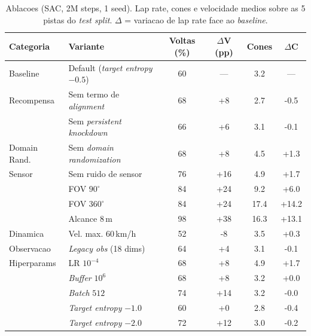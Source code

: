 \begin{table}[H]
\centering
\caption{Ablacoes (SAC, 2M steps, 1 seed). Lap rate, cones e velocidade medios sobre as 5 pistas do \textit{test split}. $\Delta$ = variacao de lap rate face ao \textit{baseline}.}
\label{tab:ablations}
\begin{tabular}{llcccc}
\toprule
\textbf{Categoria} & \textbf{Variante} & \textbf{Voltas (\%)} & \textbf{$\Delta$V (pp)} & \textbf{Cones} & \textbf{$\Delta$C} \\
\midrule
\addlinespace[2pt]
Baseline & Default (\textit{target entropy} $-0.5$) & 60 & --- & 3.2 & --- \\
\addlinespace[2pt]
Recompensa & Sem termo de \textit{alignment} & 68 & +8 & 2.7 & -0.5 \\
 & Sem \textit{persistent knockdown} & 66 & +6 & 3.1 & -0.1 \\
\addlinespace[2pt]
Domain Rand. & Sem \textit{domain randomization} & 68 & +8 & 4.5 & +1.3 \\
\addlinespace[2pt]
Sensor & Sem ruido de sensor & 76 & +16 & 4.9 & +1.7 \\
 & FOV $90^\circ$ & 84 & +24 & 9.2 & +6.0 \\
 & FOV $360^\circ$ & 84 & +24 & 17.4 & +14.2 \\
 & Alcance $8$\,m & 98 & +38 & 16.3 & +13.1 \\
\addlinespace[2pt]
Dinamica & Vel. max. $60$\,km/h & 52 & -8 & 3.5 & +0.3 \\
\addlinespace[2pt]
Observacao & \textit{Legacy obs} (18 dims) & 64 & +4 & 3.1 & -0.1 \\
\addlinespace[2pt]
Hiperparams & LR $10^{-4}$ & 68 & +8 & 4.9 & +1.7 \\
 & \textit{Buffer} $10^6$ & 68 & +8 & 3.2 & +0.0 \\
 & \textit{Batch} $512$ & 74 & +14 & 3.2 & -0.0 \\
 & \textit{Target entropy} $-1.0$ & 60 & +0 & 2.8 & -0.4 \\
 & \textit{Target entropy} $-2.0$ & 72 & +12 & 3.0 & -0.2 \\
\bottomrule
\end{tabular}
\end{table}
